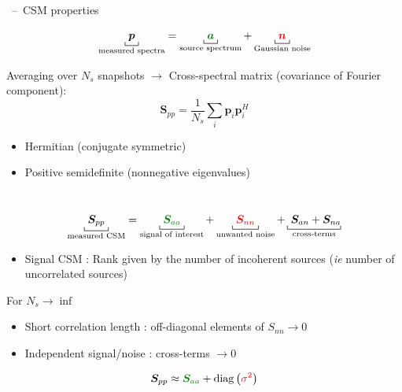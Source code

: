\documentclass[9pt,xcolor=x11names,compress, notes=show]{beamer}%
\newcommand{\diag}[1]{\operatorname{diag}\left(#1\right)}
\begin{document}
\begin{frame}{\insertsectionhead~--~CSM properties}
		
	$$\underbracket[0.5pt]{~\bm{p}~}_{\text{measured spectra}} =\underbracket[0.5pt]{~\textcolor{green}{\bm{a}}~}_{\text{source spectrum}} + \underbracket[0.5pt]{~\textcolor{red}{\bm{n}}~}_{\text{Gaussian noise}} $$
	
	Averaging over $N_s$ snapshots $\rightarrow$ Cross-spectral matrix (covariance of Fourier component):
	$$\bm{S}_{pp} = \frac{1}{N_s} \sum_i  \bm{p}_i\bm{p}_i^H$$
	\begin{itemize}
		\item Hermitian (conjugate symmetric)
		\item Positive semidefinite (nonnegative eigenvalues)
	\end{itemize}~\\
	
	$$\underbracket[0.5pt]{~\bm{S}_{pp}~}_{\text{measured CSM}} =\underbracket[0.5pt]{ ~\textcolor{green}{\bm{S}_{aa}}~}_{\text{signal of interest}} +\underbracket[0.5pt]{~\textcolor{red}{\bm{S}_{nn}}~}_{\text{unwanted noise}} + \underbracket[0.5pt]{~\bm{S}_{an}+\bm{S}_{na}}_{\text{cross-terms}}$$

	
	\begin{itemize}
		\item Signal CSM : Rank given by the number of incoherent sources (\textit{ie} number of uncorrelated sources)
	\end{itemize}
        For $N_s \rightarrow \inf$
        \begin{itemize}
		\item Short correlation length : off-diagonal elements of $S_{nn}\rightarrow 0$
		\item Independent signal/noise : cross-terms $\rightarrow 0$
	\end{itemize}
		$$\bm{S}_{pp} \approx \textcolor{green}{\bm{S}_{aa}} + \diag	{\textcolor{red}{\sigma^2}}$$
	\vfill
	
\end{frame}




\end{document}
